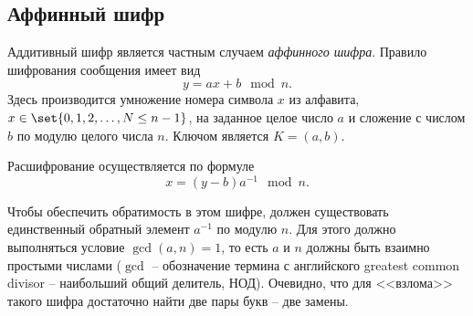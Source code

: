 \subsection{Аффинный шифр}\label{section-affine-cipher}

Аддитивный шифр является частным случаем \emph{аффинного шифра}. Правило шифрования сообщения имеет вид
    \[ y = a x + b \mod n. \]
Здесь производится умножение номера символа $x$ из алфавита, $x\in \set\{ 0, 1, 2, \dots, N \leq n-1 \}$, на заданное целое число $a$ и сложение с числом $b$ по модулю целого числа $n$. Ключом является $K = (a, b)$.

Расшифрование осуществляется по формуле
    \[ x = (y - b) a^{-1} \mod n. \]

Чтобы обеспечить обратимость в этом шифре, должен существовать единственный обратный элемент $a^{-1}$ по модулю $n$. Для этого должно выполняться условие $\gcd(a,n) = 1$, то есть $a$ и $n$ должны быть взаимно простыми числами ($\gcd$ -- обозначение термина с английского greatest common divisor -- наибольший общий делитель, $\text{НОД}$). Очевидно, что для <<взлома>> такого шифра достаточно найти две пары букв -- две замены.

